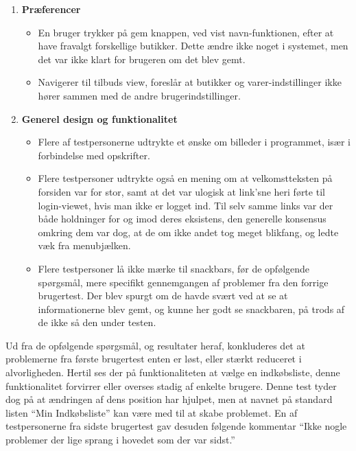 \begin{enumerate}
   \item \textbf{Præferencer}
   \begin{itemize}
      \item En bruger trykker på gem knappen, ved vist navn-funktionen, efter at have fravalgt forskellige butikker.
      Dette ændre ikke noget i systemet, men det var ikke klart for brugeren om det blev gemt.
      \item Navigerer til tilbuds view, foreslår at butikker og varer-indstillinger ikke hører sammen med de andre brugerindstillinger.
   \end{itemize}
   \item \textbf{Generel design og funktionalitet}
   \begin{itemize}
      \item Flere af testpersonerne udtrykte et ønske om billeder i programmet, især i forbindelse med opskrifter.
      \item Flere testpersoner udtrykte også en mening om at velkomstteksten på forsiden var for stor, samt at det var ulogisk at link'sne heri førte til login-viewet, hvis man ikke er logget ind.
      Til selv samme links var der både holdninger for og imod deres eksistens, den generelle konsensus omkring dem var dog, at de om ikke andet tog meget blikfang, og ledte væk fra menubjælken.
      \item Flere testpersoner lå ikke mærke til snackbars, før de opfølgende spørgsmål, mere specifikt gennemgangen af problemer fra den forrige brugertest.
      Der blev spurgt om de havde svært ved at se at informationerne blev gemt, og kunne her godt se snackbaren, på trods af de ikke så den under testen.
   \end{itemize}
\end{enumerate}

Ud fra de opfølgende spørgsmål, og resultater heraf, konkluderes det at problemerne fra første brugertest enten er løst, eller stærkt reduceret i alvorligheden.
Hertil ses der på funktionaliteten at vælge en indkøbsliste, denne funktionalitet forvirrer eller overses stadig af enkelte brugere. 
Denne test tyder dog på at ændringen af dens position har hjulpet, men at navnet på standard listen ``Min Indkøbsliste'' kan være med til at skabe problemet.
En af testpersonerne fra sidste brugertest gav desuden følgende kommentar ``Ikke nogle problemer der lige sprang i hovedet som der var sidst.''

